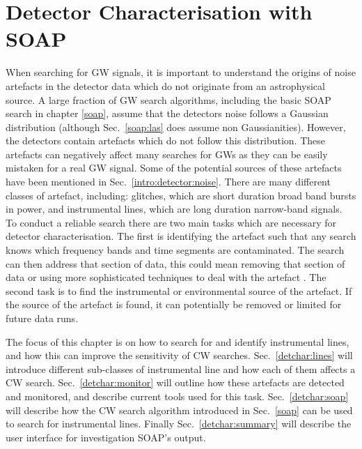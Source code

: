 \chapter{\label{detchar}Detector Characterisation with SOAP}

When searching for \gls{GW} signals, it is important to understand the origins
of noise artefacts in the detector data which do not originate from an
astrophysical source.  A large fraction of \gls{GW} search algorithms,
including the basic SOAP search in chapter \ref{soap}, assume that the detectors noise follows a Gaussian
distribution (although Sec.~\ref{soap:las} does assume non Gaussianities).  However, the detectors contain artefacts which do not follow
this distribution.  These artefacts can negatively affect many searches for
\glspl{GW} as they can be easily mistaken for a real \gls{GW} signal.  Some of
the potential sources of these artefacts have been mentioned in
Sec.~\ref{intro:detector:noise}.  There are many different classes of artefact,
including: glitches, which are short duration broad band bursts in
power, and
instrumental lines, which are long duration narrow-band signals.  To conduct a
reliable search there are two main tasks which are necessary for detector
characterisation.  The first is identifying the artefact such that any search
knows which frequency bands and time segments are contaminated.  The search can
then address that section of data, this could mean removing that section of
data or using more sophisticated techniques to deal with the artefact
\citep{pankow2018MitigationInstrumental}.  The second task is to find the
instrumental or environmental source of the artefact.  If the source of the artefact is found, it can
potentially be removed or limited for future data runs.

The focus of this chapter is on how to search for and identify instrumental lines, and how this can improve the sensitivity of \gls{CW} searches.
Sec.~\ref{detchar:lines} will introduce different sub-classes of instrumental line and how each of them affects a \gls{CW} search.
Sec.~\ref{detchar:monitor} will outline how these artefacts are detected and monitored, and describe current tools used for this task.
Sec.~\ref{detchar:soap} will describe how the \gls{CW} search algorithm
introduced in Sec.~\ref{soap} can be used to search for instrumental lines.
Finally Sec.~\ref{detchar:summary} will describe the user interface for investigation SOAP's output.



